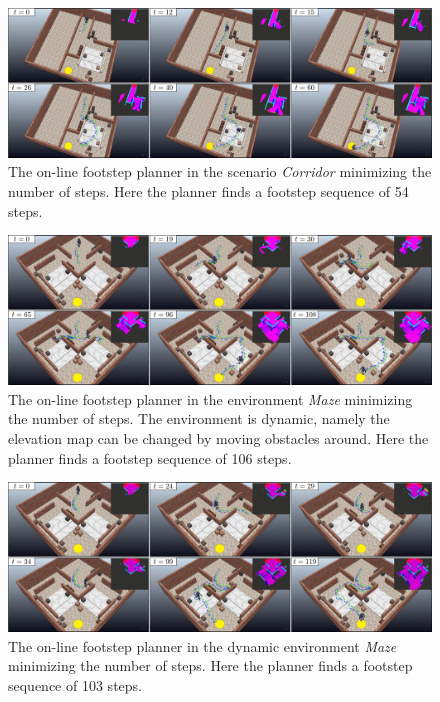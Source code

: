 \begin{figure}
    \centering
    \includegraphics[width=\textwidth]{figures/OnlineCorridor.png}
    \caption{The on-line footstep planner in the scenario \textit{Corridor} minimizing the number of steps. Here the planner finds a footstep sequence of 54 steps.}
    \label{fig:WoS:onlineCase:Corridor:Simulation}
\end{figure}
\begin{figure}
    \centering
    \includegraphics[width=\textwidth]{figures/OnlineMazeDynamic.png}
    \caption{The on-line footstep planner in the environment \textit{Maze} minimizing the number of steps. The environment is dynamic, namely the elevation map can be changed by moving obstacles around. Here the planner finds a footstep sequence of 106 steps.}
    \label{fig:WoS:onlineCase:MazeDynamic:Simulation}
\end{figure}
\begin{figure}
    \centering
    \includegraphics[width=\textwidth]{figures/OnlineMazeStopandgo.png}
    \caption{The on-line footstep planner in the dynamic environment \textit{Maze} minimizing the number of steps. Here the planner finds a footstep sequence of 103 steps.}
    \label{fig:WoS:onlineCase:MazeStopAndGo:Simulation}
\end{figure}

